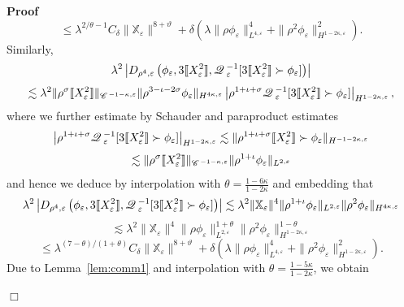 \documentclass[a4paper,11pt]{article}
\newenvironment{proof}{\noindent\textbf{Proof\ }}{\hspace*{\fill}$\Box$\medskip}
\numberwithin{equation}{section}
\newcommand{\CC}{\mathscr{C} \hspace{.1em}}
\newcommand{\Q}{\mathscr{Q} \hspace{.2em}}
\begin{document}
\begin{proof}
\[     \leqslant \lambda^{2 / \theta - 1} C_{\delta} \|\mathbb{X}_{\varepsilon}
     \|^{8 + \vartheta} + \delta (\lambda \| \rho \phi_{\varepsilon} \|_{L^{4,
     \varepsilon}}^4 +\| \rho^2 \phi_{\varepsilon} \|_{H^{1 - 2 \kappa,
     \varepsilon}}^2) . \]
  Similarly,
  \[ \lambda^2 \left| D_{\rho^4, \varepsilon} \left( \phi_{\varepsilon}, 3
     \llbracket X_{\varepsilon}^2 \rrbracket, \Q_{\varepsilon}^{- 1} [3
     \llbracket X_{\varepsilon}^2 \rrbracket \succ \phi_{\varepsilon}] \right)
     \right| \]
  \[ \lesssim \lambda^2  \| \rho^{\sigma} \llbracket X_{\varepsilon}^2
     \rrbracket \|_{\CC^{- 1 - \kappa, \varepsilon}} \| \rho^{3 - \iota - 2
     \sigma} \phi_{\varepsilon} \|_{H^{4 \kappa, \varepsilon}} \left| \rho^{1
     + \iota + \sigma} \Q_{\varepsilon}^{- 1} [3 \llbracket X_{\varepsilon}^2
     \rrbracket \succ \phi_{\varepsilon}] \right|_{H^{1 - 2 \kappa,
     \varepsilon}}, \]
  where we further estimate by Schauder and paraproduct estimates
  \[ \left| \rho^{1 + \iota + \sigma} \Q_{\varepsilon}^{- 1} [3 \llbracket
     X_{\varepsilon}^2 \rrbracket \succ \phi_{\varepsilon}] \right|_{H^{1 - 2
     \kappa, \varepsilon}} \lesssim \| \rho^{1 + \iota + \sigma} \llbracket
     X_{\varepsilon}^2 \rrbracket \succ \phi_{\varepsilon} \|_{H^{- 1 - 2
     \kappa, \varepsilon}} \]
  \[ \lesssim \| \rho^{\sigma} \llbracket X_{\varepsilon}^2 \rrbracket
     \|_{\CC^{- 1 - \kappa, \varepsilon}}  \| \rho^{1 + \iota}
     \phi_{\varepsilon} \|_{L^{2, \varepsilon}} \]
  and hence we deduce by interpolation with $\theta = \frac{1 - 6 \kappa}{1 -
  2 \kappa}$ and embedding that
  \[ \lambda^2 \left| D_{\rho^4, \varepsilon} \left( \phi_{\varepsilon}, 3
     \llbracket X_{\varepsilon}^2 \rrbracket, \Q_{\varepsilon}^{- 1} [3
     \llbracket X_{\varepsilon}^2 \rrbracket \succ \phi_{\varepsilon}] \right)
     \right| \lesssim \lambda^2 \|\mathbb{X}_{\varepsilon} \|^4  \| \rho^{1 +
     \iota} \phi_{\varepsilon} \|_{L^{2, \varepsilon}}  \| \rho^2
     \phi_{\varepsilon} \|_{H^{4 \kappa, \varepsilon}} \]
  \[ \lesssim \lambda^2 \|\mathbb{X}_{\varepsilon} \|^4  \| \rho
     \phi_{\varepsilon} \|^{1 + \theta}_{L^{2, \varepsilon}}  \| \rho^2
     \phi_{\varepsilon} \|^{1 - \theta}_{H^{1 - 2 \kappa, \varepsilon}} \]
  \[ \leqslant \lambda^{(7 - \theta) / (1 + \theta)} C_{\delta}
     \|\mathbb{X}_{\varepsilon} \|^{8 + \vartheta} + \delta (\lambda \| \rho
     \phi_{\varepsilon} \|_{L^{4, \varepsilon}}^4 +\| \rho^2
     \phi_{\varepsilon} \|_{H^{1 - 2 \kappa, \varepsilon}}^2) . \]
  Due to Lemma~\ref{lem:comm1} and interpolation with $\theta =
  \frac{1 - 5 \kappa}{1 - 2 \kappa}$, we obtain 

\end{proof}
\end{document}
